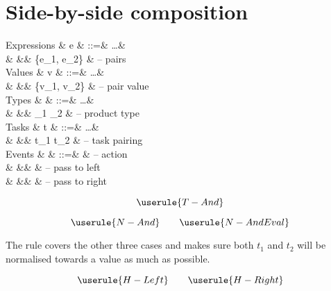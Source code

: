 
\section{Side-by-side composition}


\begin{grammar}
  Expressions
    & e    & ::=& \ldots               & \\
    &      &\mid& \{e_1, e_2\}         & – pairs \\
  Values
    & v    & ::=& \ldots               & \\
    &      &\mid& \{v_1, v_2\}         & – pair value \\
  Types
    & \tau & ::=& \ldots               & \\
    &      &\mid& \tau_1 \times \tau_2 & – product type \\
  Tasks
    & t    & ::=& \ldots               & \\
    &      &\mid& t_1 \All t_2         & – task pairing \\
  Events
    & \eta & ::=& \alpha               & – action \\
    &      &\mid& \Left \eta           & – pass to left \\
    &      &\mid& \Right \eta          & – pass to right \\
\end{grammar}

\begin{equation*}
  \userule{T-And}
\end{equation*}

\begin{equation*}
  \userule{N-And} \qquad \userule{N-AndEval}
\end{equation*}

The rule  covers the other three cases and makes sure both $t_1$ and $t_2$ will be normalised towards a value as much as possible.

\renewcommand*{\AndOr}{\All}

\begin{equation*}
  \userule{H-Left} \qquad \userule{H-Right}
\end{equation*}
